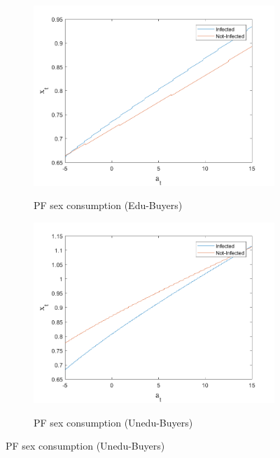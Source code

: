 \begin{figure}[H]\caption{Antiretroviral treatment (ARTs), continuation}
\begin{subfigure}{0.5\textwidth}\caption{PF sex consumption (Edu-Buyers)}
   \includegraphics[width=\linewidth,height = 0.22\textheight]{figures/art/FIG9.png}
    \label{stage_4fig_1}
\end{subfigure}
\hspace*{\fill}
\begin{subfigure}{0.5\textwidth}\caption{PF sex consumption (Unedu-Buyers)}
   \includegraphics[width=\linewidth,height = 0.22\textheight]{figures/art/FIG10.png}
    \label{stage_4fig_2}
\end{subfigure}

\end{figure}
